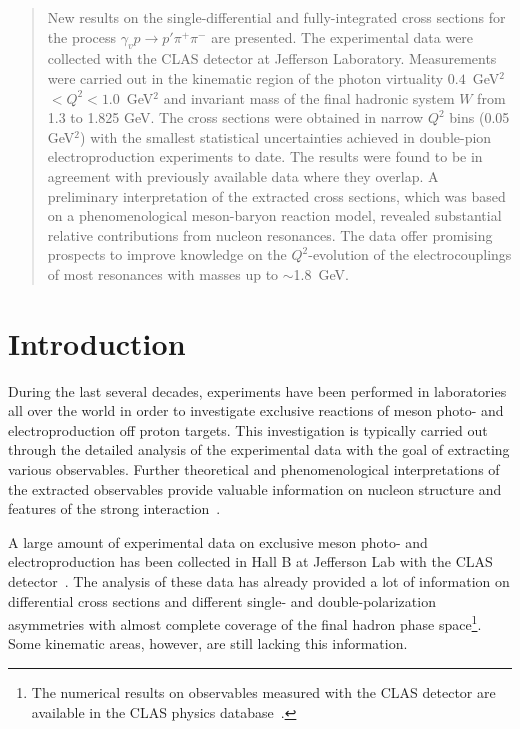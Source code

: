 \documentclass[prc,twocolumn,superscriptaddress,showpacs,amssymb,amsmath,amsfonts,aps,nofootinbib]{revtex4-1}
\begin{document}
\noaffiliation


\begin{abstract}
New results on the single-differential and fully-integrated
cross sections for the process $\gamma_{v} p \rightarrow p' \pi^{+} \pi^{-}$ are presented. 
The experimental data  were collected with the CLAS detector at
Jefferson Laboratory.
Measurements were carried out in the kinematic region of
the photon virtuality $0.4$~GeV$^2$ $< Q^2 < 1.0$~GeV$^2$
and invariant mass of the final hadronic system $W$ from 1.3
to 1.825 GeV. The cross sections were obtained in narrow $Q^{2}$ bins (0.05 GeV$^{2}$) with the smallest statistical uncertainties achieved in double-pion electroproduction experiments to date.
The results were found to be in agreement with previously available data where they overlap.
A preliminary interpretation of the extracted cross sections, which was based on  a phenomenological meson-baryon  reaction model, revealed substantial relative contributions from  nucleon resonances.
The data offer promising prospects to improve knowledge on the  $Q^{2}$-evolution of the electrocouplings of most resonances with masses up to $\sim$1.8~GeV.
\end{abstract}




\maketitle


\section{Introduction  }
\label{intro}

During the last several decades, experiments have been performed in laboratories all over the world in order to investigate exclusive reactions of meson photo- and electroproduction off proton targets.
This investigation is typically carried out through the detailed analysis of the experimental data
 with the goal of extracting various observables. Further theoretical and phenomenological interpretations of the extracted observables provide valuable information on nucleon structure and features of the strong interaction~\cite{Burkert:2016kyi,Krusche:2003ik,Aznauryan:2011qj,Skorodumina:2016pnb}.
 
 A large amount  of experimental data on exclusive meson photo- and electroproduction has been collected in Hall B at Jefferson Lab with the CLAS detector~\cite{Me03}.
The analysis of these data has already provided a lot of information on differential cross sections and different single- and double-polarization asymmetries with almost complete coverage of the final hadron phase space\footnote[1]{The numerical results on observables measured with the CLAS detector are available in the CLAS physics database~\cite{CLAS_DB}.}. Some kinematic areas, however, are still lacking this information. 
\end{document}
